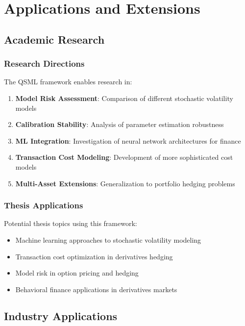 \documentclass[12pt,a4paper]{article}
\begin{document}
\section{Applications and Extensions}

\subsection{Academic Research}

\subsubsection{Research Directions}

The QSML framework enables research in:

\begin{enumerate}
    \item \textbf{Model Risk Assessment}: Comparison of different stochastic volatility models
    \item \textbf{Calibration Stability}: Analysis of parameter estimation robustness
    \item \textbf{ML Integration}: Investigation of neural network architectures for finance
    \item \textbf{Transaction Cost Modeling}: Development of more sophisticated cost models
    \item \textbf{Multi-Asset Extensions}: Generalization to portfolio hedging problems
\end{enumerate}

\subsubsection{Thesis Applications}

Potential thesis topics using this framework:

\begin{itemize}
    \item Machine learning approaches to stochastic volatility modeling
    \item Transaction cost optimization in derivatives hedging
    \item Model risk in option pricing and hedging
    \item Behavioral finance applications in derivatives markets
\end{itemize}

\subsection{Industry Applications}
\end{document}
